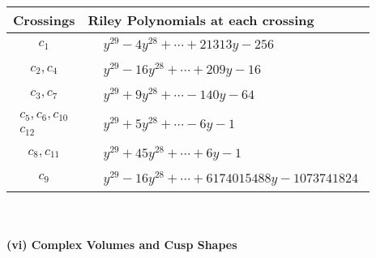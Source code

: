 \documentclass[1p]{elsarticle_modified}
\theoremstyle{definition}
\begin{document}
\begin{tabular}{m{50pt}|m{274pt}}
Crossings & \hspace{64pt}Riley Polynomials at each crossing \\
\hline $$\begin{aligned}c_{1}\end{aligned}$$&$\begin{aligned}
&y^{29}-4 y^{28}+\cdots+21313 y-256
\end{aligned}$\\
\hline $$\begin{aligned}c_{2},c_{4}\end{aligned}$$&$\begin{aligned}
&y^{29}-16 y^{28}+\cdots+209 y-16
\end{aligned}$\\
\hline $$\begin{aligned}c_{3},c_{7}\end{aligned}$$&$\begin{aligned}
&y^{29}+9 y^{28}+\cdots-140 y-64
\end{aligned}$\\
\hline $$\begin{aligned}c_{5},c_{6},c_{10}\\c_{12}\end{aligned}$$&$\begin{aligned}
&y^{29}+5 y^{28}+\cdots-6 y-1
\end{aligned}$\\
\hline $$\begin{aligned}c_{8},c_{11}\end{aligned}$$&$\begin{aligned}
&y^{29}+45 y^{28}+\cdots+6 y-1
\end{aligned}$\\
\hline $$\begin{aligned}c_{9}\end{aligned}$$&$\begin{aligned}
&y^{29}-16 y^{28}+\cdots+6174015488 y-1073741824
\end{aligned}$\\
\hline
\end{tabular}\\~\\
\newpage\flushleft \textbf{(vi) Complex Volumes and Cusp Shapes}
\end{document}
